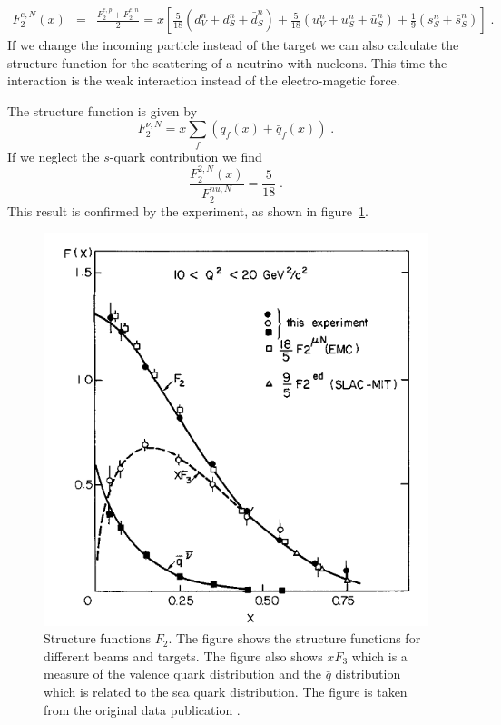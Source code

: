 \documentclass[12pt]{article}
\begin{document}
\begin{eqnarray*}\label{eq:F2eN}
F_2^{e,N}(x)&=&\frac{F_2^{e,p}+F_2^{e,n}}{2}=x\left[
\frac{5}{18}\left(d_V^n+d_S^{n}+\bar d_S^n\right)+
\frac{5}{18}\left(u_V^n+u_S^{n}+\bar u_S^n\right)+
\frac{1}{9}\left(s_S^{n}+\bar s_S^n\right)
\right]\;.
\end{eqnarray*}
If we change the incoming particle instead of the target we can also calculate the structure function for the scattering of a neutrino with nucleons. This time the interaction is the weak interaction instead of the electro-magetic force. 

The structure function is given by
\begin{equation}\label{eq:F2vN}
F_2^{\nu,N}=x\sum\limits_f\left(q_f(x)+\bar q_f(x)\right)\;.
\end{equation} 
If we neglect the $s$-quark contribution we find 
\[\frac{F_2^{2,N}(x)}{F_2^{nu,N}}=\frac{5}{18}\;.\]
This result is confirmed by the experiment, as shown in figure~\ref{fig:F2vN}.
\begin{figure}
\begin{center}
\includegraphics[scale=0.5]{images/neutrinoNucleonStructureFunction.png} 
\end{center}
\caption{Structure functions $F_2$. The figure shows the structure functions for different beams and targets. The figure also shows $xF_3$ which is a measure of the valence quark distribution and the $\bar q$ distribution which is related to the sea quark distribution. The figure is taken from the original data publication \cite{Abramowicz:1982re}.}\label{fig:F2vN}
\end{figure}
\end{document}
